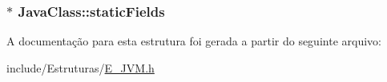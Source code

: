 \subsubsection[{static\+Fields}]{$\ast$ Java\+Class\+::static\+Fields}\label{struct_java_class_a4ce091e3ddb1f607166c6e64c39cf53a}


A documentação para esta estrutura foi gerada a partir do seguinte arquivo\+:\begin{DoxyCompactItemize}
\item 
include/\+Estruturas/\hyperlink{_e___j_v_m_8h}{E\+\_\+\+J\+V\+M.\+h}\end{DoxyCompactItemize}
